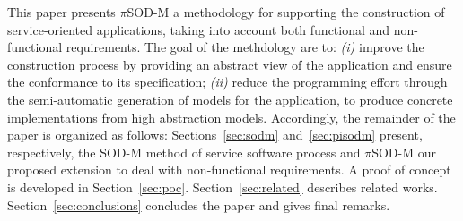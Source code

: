 %


This paper presents $\pi$SOD-M  a methodology for supporting the construction of service-oriented applications, taking into account both functional and non-functional requirements. The goal of the methdology are to:
\textit{(i)} improve the construction process by providing an abstract view of the application and ensure the conformance to its specification;
\textit{(ii)} reduce the programming effort through the semi-automatic generation of  models for the application, to produce concrete implementations from high abstraction models.
%
Accordingly, the remainder of the paper is organized as follows:
Sections~\ref{sec:sodm} and~\ref{sec:pisodm} present, respectively, the SOD-M method of service software process and $\pi$SOD-M our proposed extension to deal with non-functional requirements.
A proof of concept  is developed in Section~\ref{sec:poc}. Section~\ref{sec:related} describes related works.
Section~\ref{sec:conclusions} concludes the paper  and gives final remarks.
